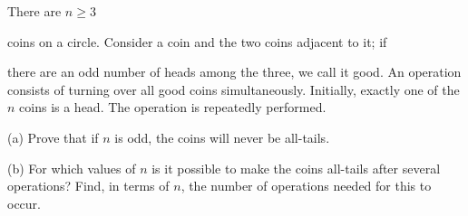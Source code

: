 There are $ n \ge 3$

 coins on a circle. Consider a coin and the two coins adjacent to it; if

 there are an odd number of heads among the three, we call it good. An operation consists of turning over all good coins simultaneously. Initially, exactly one of the $ n$ coins is a head. The operation is repeatedly performed.

(a) Prove that if $ n$ is odd, the coins will never be all-tails.

(b) For which values of $ n$ is it possible to make the coins all-tails after several operations? Find, in terms of $ n$, the number of operations needed for this to occur.